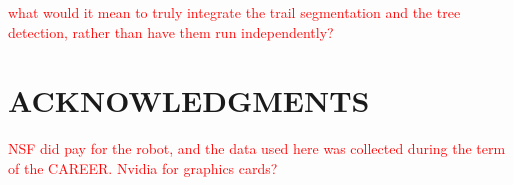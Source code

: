 \documentclass[letterpaper, 10 pt, conference]{ieeeconf}  %
\newcommand{\comment}[1]{\textcolor{red}{#1}}
\begin{document}
\comment{what would it mean to truly integrate the trail segmentation and the tree detection,
  rather than have them run independently?}


\addtolength{\textheight}{-12cm}   %


\section*{ACKNOWLEDGMENTS}

\comment{NSF did pay for the robot, and the data used here was collected during the term of the CAREER.  Nvidia for graphics cards?}


{\small

%

}







\end{document}
